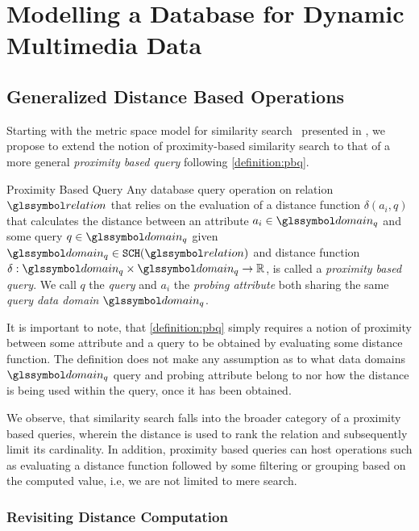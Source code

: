 \chapter{Modelling a Database for Dynamic Multimedia Data}
\label{chapter:system_model}

\section{Generalized Distance Based Operations}

Starting with the metric space model for similarity search~\cite{Zezula:2006similarity}  presented in , we propose to extend the notion of proximity-based similarity search to that of a more general \emph{proximity based query} following \cref{definition:pbq}.

\begin{definition}[label=definition:pbq]{Proximity Based Query}{}
    Any database query operation on relation $\relation$ that relies on the evaluation of a distance function $\delta(a_{i}, q)$ that calculates the distance between an attribute $a_{i} \in \domain_q$ and some query $q \in \domain_q$ given $\domain_q \in \mathtt{SCH}(\relation)$ and distance function $\delta: \domain_q \times \domain_q \rightarrow \mathbb{R}$, is called a \emph{proximity based query}. We call $q$ the \emph{query} and $a_i$ the \emph{probing attribute} both sharing the same \emph{query data domain} $\domain_q$.
\end{definition}

It is important to note, that \cref{definition:pbq} simply requires a notion of proximity between some attribute and a query to be obtained by evaluating some distance function. The definition does not make any assumption as to what data domains $\domain_q$ query and probing attribute belong to nor how the distance is being used within the query, once it has been obtained. 

We observe, that similarity search falls into the broader category of a proximity based queries, wherein the distance is used to rank the relation and subsequently limit its cardinality. In addition, proximity based queries can host operations such as evaluating a distance function followed by some filtering or grouping based on the computed value, i.e, we are not limited to mere search.

\subsection{Revisiting Distance Computation}

